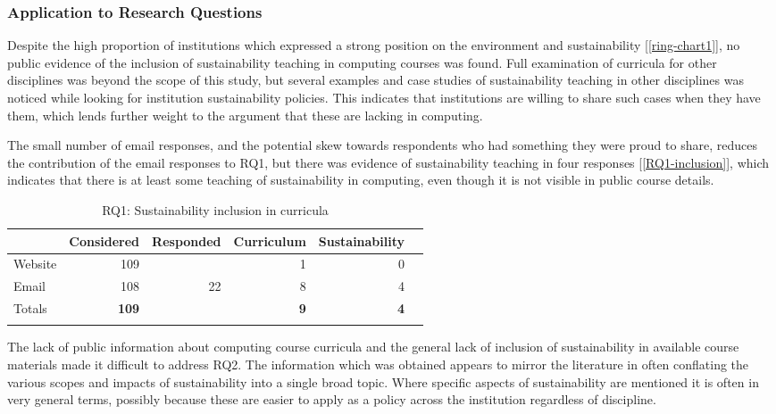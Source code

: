 \subsubsection*{Application to Research Questions}


Despite the high proportion of institutions which expressed a strong position on the environment and sustainability [\autoref{ring-chart1}], no public evidence of the inclusion of sustainability teaching in computing courses was found. Full examination of curricula for other disciplines was beyond the scope of this study, but several examples and case studies of sustainability teaching in other disciplines was noticed while looking for institution sustainability policies. This indicates that institutions are willing to share such cases when they have them, which lends further weight to the argument that these are lacking in computing.

The small number of email responses, and the potential skew towards respondents who had something they were proud to share, reduces the contribution of the email responses to RQ1, but there was evidence of sustainability teaching in four responses [\autoref{RQ1-inclusion}], which indicates that there is at least some teaching of sustainability in computing, even though it is not visible in public course details.

\begin{table}
\begin{tabular}{lrrrrr} \toprule
 & Considered & Responded & Curriculum & Sustainability \\
\midrule
Website & 109 & & 1 & 0 \\
Email & 108 & 22 & 8 & 4 \\
\midrule
Totals & \textbf{109} & & \textbf{9} & \textbf{4} \\
\bottomrule \\
\end{tabular}
\caption{\label{RQ1-inclusion} RQ1: Sustainability inclusion in curricula}
\end{table}


The lack of public information about computing course curricula and the general lack of inclusion of sustainability in available course materials made it difficult to address RQ2. The information which was obtained appears to mirror the literature in often conflating the various scopes and impacts of sustainability into a single broad topic. Where specific aspects of sustainability are mentioned it is often in very general terms, possibly because these are easier to apply as a policy across the institution regardless of discipline.

